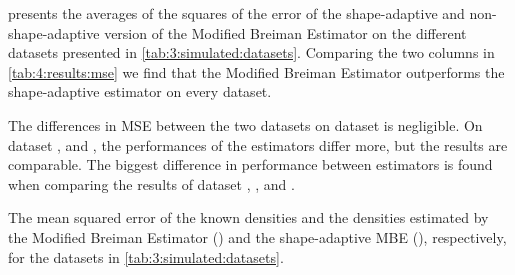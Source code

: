 

 presents the averages of the squares of the error of the shape-adaptive and non-shape-adaptive version of the Modified Breiman Estimator on the different datasets presented in \cref{tab:3:simulated:datasets}. Comparing the two columns in \cref{tab:4:results:mse} we find that the Modified Breiman Estimator outperforms the shape-adaptive estimator on every dataset. 

The differences in MSE between the two datasets on dataset \ferdosiOne is negligible. On dataset \ferdosiTwo, and \ferdosiFive, the performances of the estimators differ more, but the results are comparable. The biggest difference in performance between estimators is found when comparing the results of dataset \baakmanOne, \baakmanFour, and \baakmanFive.

\begin{table}
	\centering
	
	\caption{The mean squared error of the known densities and the densities estimated by the Modified Breiman Estimator (\mbe) and the shape-adaptive MBE (\sambe), respectively, for the datasets in \cref{tab:3:simulated:datasets}.} 	
	\label{tab:4:results:mse}
\end{table}

